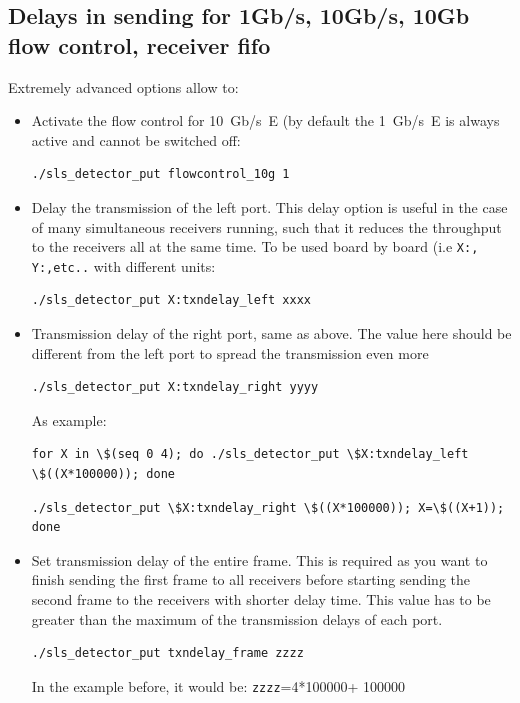 \documentclass{article}
\begin{document}
\subsection{Delays in sending for 1Gb/s, 10Gb/s, 10Gb flow control, receiver fifo}

Extremely advanced options allow to:
\begin{itemize}
\item Activate the flow control for 10~Gb/s~E (by default the 1~Gb/s~E is always active and cannot be switched off:
\begin{verbatim}
./sls_detector_put flowcontrol_10g 1
\end{verbatim}
\item  Delay the transmission of the left port. This delay option is useful in the case of many simultaneous receivers running, such that it reduces the throughput to the receivers all at the same time. To be used board by board (i.e {\tt{X:, Y:,etc..}} with different units:
\begin{verbatim}
./sls_detector_put X:txndelay_left xxxx 
\end{verbatim}
\item  Transmission delay of the right port, same as above. The value here should be different from the left port to spread the transmission even more 
\begin{verbatim}
./sls_detector_put X:txndelay_right yyyy
\end{verbatim}
As example:
\begin{verbatim}
for X in \$(seq 0 4); do ./sls_detector_put \$X:txndelay_left \$((X*100000)); done
 \end{verbatim}
\begin{verbatim}
./sls_detector_put \$X:txndelay_right \$((X*100000)); X=\$((X+1)); done
\end{verbatim}

\item Set transmission delay of the entire frame. This is required as you want to finish sending the first frame to all receivers before starting sending the second frame to the receivers with shorter delay time.  This value has to be greater than the maximum of the transmission delays of each port.      
\begin{verbatim}
./sls_detector_put txndelay_frame zzzz
\end{verbatim}
In the example before, it would be: {\tt{zzzz}}=4*100000+ 100000


\end{itemize}
\end{document}
